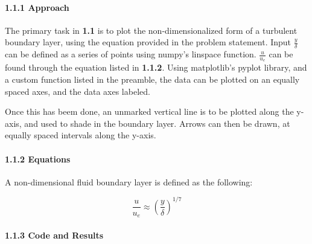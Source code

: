 \documentclass[11pt]{article}
\begin{document}
\hypertarget{approach}{%
\paragraph{1.1.1 \textbar{} Approach}\label{approach}}

The primary task in \textbf{1.1} is to plot the non-dimensionalized form
of a turbulent boundary layer, using the equation provided in the
problem statement. Input \(\frac{y}{\delta}\) can be defined as a series
of points using numpy's linspace function. \(\frac{u}{u_e}\) can be
found through the equation listed in \textbf{1.1.2}. Using matplotlib's
pyplot library, and a custom function listed in the preamble, the data
can be plotted on an equally spaced axes, and the data axes labeled.

Once this has beem done, an unmarked vertical line is to be plotted
along the y-axis, and used to shade in the boundary layer. Arrows can
then be drawn, at equally spaced intervals along the y-axis.

\hypertarget{equations}{%
\paragraph{1.1.2 \textbar{} Equations}\label{equations}}

A non-dimensional fluid boundary layer is defined as the following:

\[\begin{equation}
    \frac{u}{u_e} \approx (\frac{y}{\delta})^{1/7}
\end{equation}\]

\hypertarget{code-and-results}{%
\paragraph{1.1.3 \textbar{} Code and Results}\label{code-and-results}}
\end{document}
